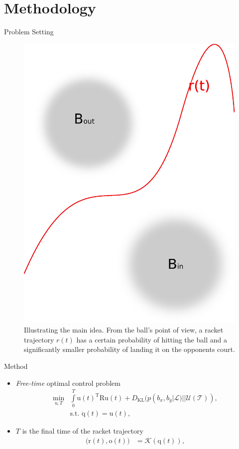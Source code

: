 \documentclass[handout]{beamer}
\newcommand{\boldvec}[1]{\boldsymbol{\mathrm{#1}}}
\let\vec\boldvec
\newcommand{\kin}{\mathcal{K}} %
\newcommand{\joint}{\vec{q}} %
\newcommand{\sysInput}{\vec{u}} %
\newcommand{\racket}{\vec{r}} %
\newcommand{\orient}{\vec{o}} %
\newcommand{\court}{\mathcal{T}} %
\newcommand{\landEvent}{\mathcal{L}} %
\newcommand{\KL}{D_{\mathrm{KL}}}
\begin{document}
\section{Methodology}
%
\begin{frame}{Problem Setting}
\begin{figure}[t!]
\centering
\includegraphics[scale=0.3]{drawingBallsEye.eps}			
\caption{Illustrating the main idea. From the ball's point of view, a racket trajectory $r(t)$ has a certain probability of hitting the ball and a significantly smaller probability of landing it on the opponents court.}
\label{mainIdea2}
\end{figure}
\end{frame}
%
\begin{frame}{Method}
\begin{itemize}
\item \emph{Free-time} optimal control problem
%
\begin{align}
\min_{\sysInput,T} & \int\limits_{0}^{T}\sysInput(t)^{\mathrm{T}}\vec{R}\sysInput(t) + \KL(p(b_x,b_y|\landEvent)||\mathcal{U}(\court)), \\
& \textrm{s.t. } \ddot{\joint}(t) = \sysInput(t),
\label{costFnc1}
\end{align}
%
\item $T$ is the final time of the racket trajectory 
%
\begin{align}
\big(\racket(t),\orient(t)\big) &= \kin(\joint(t)),
\end{align}
\end{itemize}
\end{frame}
\end{document}
